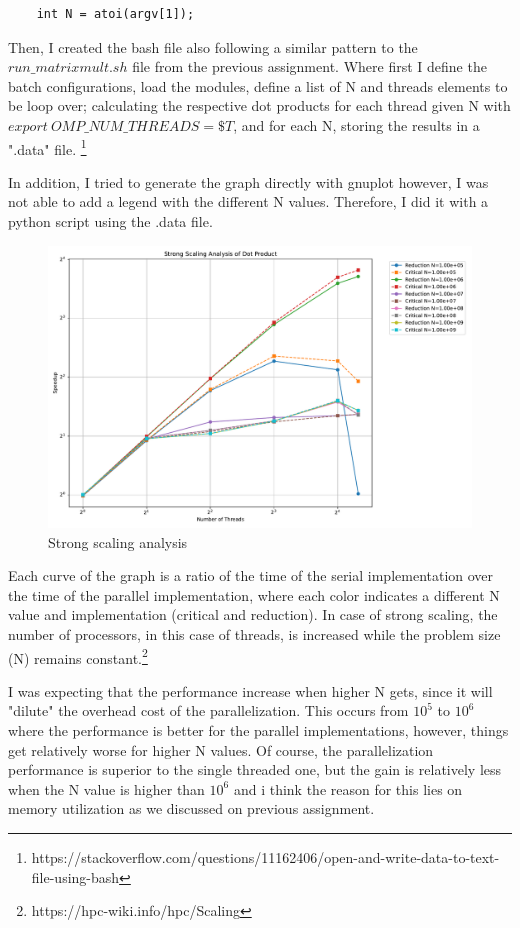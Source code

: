 \documentclass[unicode,11pt,a4paper,oneside,numbers=endperiod,openany]{scrartcl}
\begin{document}
\begin{lstlisting}
    int N = atoi(argv[1]);
\end{lstlisting}

Then, I created the bash file also following a similar pattern to the $run\_matrixmult.sh$ file from the previous assignment.
Where first I define the batch configurations, load the modules, define a list of N and threads elements to be loop over; 
calculating the respective dot products for each thread given N with $export \ OMP\_NUM\_THREADS=\$T$, and for each N, storing the results in a ".data" file. 
\footnote{https://stackoverflow.com/questions/11162406/open-and-write-data-to-text-file-using-bash} 

In addition, I tried to generate the graph directly with gnuplot however, I was not able to add a legend with the different N values. Therefore, I did it with a python script using the .data file. 

\begin{figure}[H]
    \centering
    \includegraphics[width=\textwidth]{./img/exe1/dotproduct_strong_scaling.pdf}
    \caption{Strong scaling analysis}
\end{figure}

Each curve of the graph is a ratio of the time of the serial implementation over the time of the parallel implementation, where each color 
indicates a different N value and implementation (critical and reduction). In case of strong scaling, 
the number of processors, in this case of threads, is increased while the problem size (N) remains constant.\footnote{https://hpc-wiki.info/hpc/Scaling}

I was expecting that the performance increase when higher N gets, since it will "dilute" the overhead cost of the parallelization. 
This occurs from $10^5$ to $10^6$ where the performance is better for the parallel implementations, however, things get relatively worse for higher N values.
Of course, the parallelization performance is superior to the single threaded one, but the gain is relatively less when the N value is higher than $10^6$ and i think the 
reason for this lies on memory utilization as we discussed on previous assignment.
\end{document}
